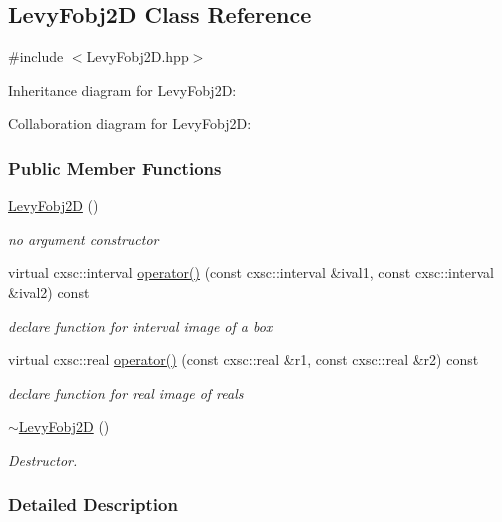 \hypertarget{classLevyFobj2D}{\subsection{\-Levy\-Fobj2\-D \-Class \-Reference}
\label{classLevyFobj2D}
}


{\ttfamily \#include $<$\-Levy\-Fobj2\-D.\-hpp$>$}



\-Inheritance diagram for \-Levy\-Fobj2\-D\-:


\-Collaboration diagram for \-Levy\-Fobj2\-D\-:
\subsubsection*{\-Public \-Member \-Functions}
\begin{DoxyCompactItemize}
\item 
\hyperlink{classLevyFobj2D_a91be21623fb5bdf9c1b5156d2f8aa336}{\-Levy\-Fobj2\-D} ()
\begin{DoxyCompactList}\small\item\em no argument constructor \end{DoxyCompactList}\item 
virtual cxsc\-::interval \hyperlink{classLevyFobj2D_aba9f8611a62e6b34ceff101f676deb06}{operator()} (const cxsc\-::interval \&ival1, const cxsc\-::interval \&ival2) const 
\begin{DoxyCompactList}\small\item\em declare function for interval image of a box \end{DoxyCompactList}\item 
virtual cxsc\-::real \hyperlink{classLevyFobj2D_a2681e5ab1e51b953ec804e1d04da9b3d}{operator()} (const cxsc\-::real \&r1, const cxsc\-::real \&r2) const 
\begin{DoxyCompactList}\small\item\em declare function for real image of reals \end{DoxyCompactList}\item 
\hyperlink{classLevyFobj2D_ad162dbfba13fbb393d7595659af0d04c}{$\sim$\-Levy\-Fobj2\-D} ()
\begin{DoxyCompactList}\small\item\em \-Destructor. \end{DoxyCompactList}\end{DoxyCompactItemize}


\subsubsection{\-Detailed \-Description}


